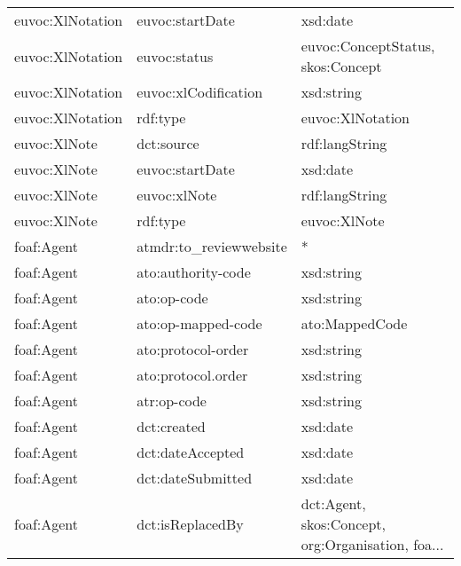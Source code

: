 \documentclass[10pt,a4paper,titlepage,final]{article}
\begin{document}
\begin{longtable}{lll}
    euvoc:XlNotation &         euvoc:startDate &                                           xsd:date \\
    euvoc:XlNotation &            euvoc:status &                  euvoc:ConceptStatus, skos:Concept \\
    euvoc:XlNotation &    euvoc:xlCodification &                                         xsd:string \\
    euvoc:XlNotation &                rdf:type &                                   euvoc:XlNotation \\
        euvoc:XlNote &              dct:source &                                     rdf:langString \\
        euvoc:XlNote &         euvoc:startDate &                                           xsd:date \\
        euvoc:XlNote &            euvoc:xlNote &                                     rdf:langString \\
        euvoc:XlNote &                rdf:type &                                       euvoc:XlNote \\
          foaf:Agent &  atmdr:to\_reviewwebsite &                                                  * \\
          foaf:Agent &      ato:authority-code &                                         xsd:string \\
          foaf:Agent &             ato:op-code &                                         xsd:string \\
          foaf:Agent &      ato:op-mapped-code &                                     ato:MappedCode \\
          foaf:Agent &      ato:protocol-order &                                         xsd:string \\
          foaf:Agent &      ato:protocol.order &                                         xsd:string \\
          foaf:Agent &             atr:op-code &                                         xsd:string \\
          foaf:Agent &             dct:created &                                           xsd:date \\
          foaf:Agent &        dct:dateAccepted &                                           xsd:date \\
          foaf:Agent &       dct:dateSubmitted &                                           xsd:date \\
          foaf:Agent &        dct:isReplacedBy &  dct:Agent, skos:Concept, org:Organisation, foa... \\

\end{longtable}
\end{document}
